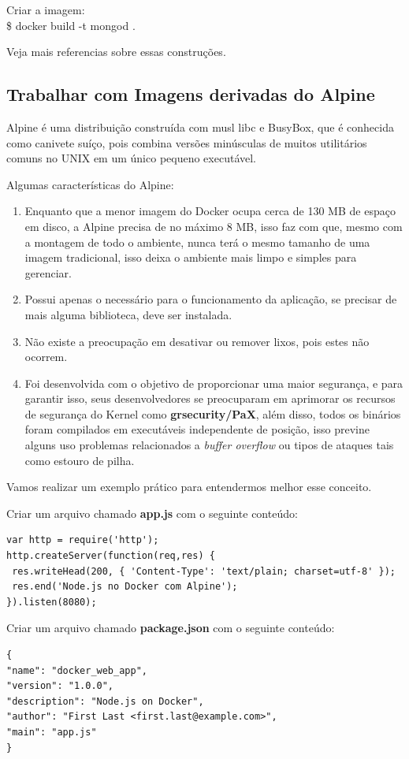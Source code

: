 \documentclass[a4paper,11pt]{article}
\begin{document}
Criar a imagem: \\
{\ttfamily\$ docker build -t mongod .}

Veja mais referencias sobre essas construções\cite{constimagem}.

\subsection{Trabalhar com Imagens derivadas do Alpine}
Alpine é uma distribuição construída com musl libc e BusyBox, que é conhecida como canivete suíço, pois combina versões minúsculas de muitos utilitários comuns no UNIX em um único pequeno executável.

Algumas características do Alpine: \vspace{-1em}
\begin{enumerate}
  \item Enquanto que a menor imagem do Docker ocupa cerca de 130 MB de espaço em disco, a Alpine precisa de no máximo 8 MB, isso faz com que, mesmo com a montagem de todo o ambiente, nunca terá o mesmo tamanho de uma imagem tradicional, isso deixa o ambiente mais limpo e simples para gerenciar.
  \item Possui apenas o necessário para o funcionamento da aplicação, se precisar de mais alguma biblioteca, deve ser instalada.
  \item Não existe a preocupação em desativar ou remover lixos, pois estes não ocorrem.
  \item Foi desenvolvida com o objetivo de proporcionar uma maior segurança, e para garantir isso, seus desenvolvedores se preocuparam em aprimorar os recursos de segurança do Kernel como \textbf{grsecurity/PaX}, além disso, todos os binários foram compilados em executáveis independente de posição, isso previne alguns uso problemas relacionados a \textit{buffer overflow} ou tipos de ataques tais como estouro de pilha.
\end{enumerate}

Vamos realizar um exemplo prático para entendermos melhor esse conceito.

Criar um arquivo chamado \textbf{app.js} com o seguinte conteúdo:
\begin{lstlisting}
var http = require('http');
http.createServer(function(req,res) {
 res.writeHead(200, { 'Content-Type': 'text/plain; charset=utf-8' });
 res.end('Node.js no Docker com Alpine');
}).listen(8080);
\end{lstlisting}

Criar um arquivo chamado \textbf{package.json} com o seguinte conteúdo:
\begin{lstlisting}
{
"name": "docker_web_app",
"version": "1.0.0",
"description": "Node.js on Docker",
"author": "First Last <first.last@example.com>",
"main": "app.js"
}
\end{lstlisting}
\end{document}
